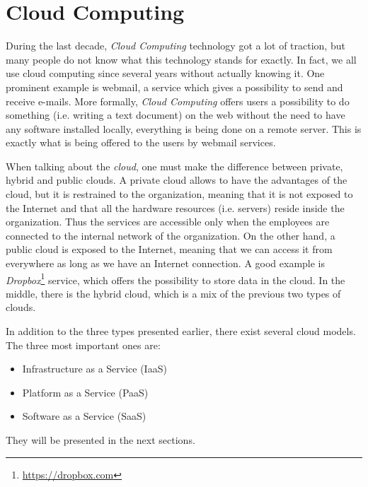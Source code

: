 

\chapter{Cloud Computing}
During the last decade, \textit{Cloud Computing} technology got a lot of traction, but many people do not know what this technology stands for exactly. 
In fact, we all use cloud computing since several years without actually knowing it. One prominent example is webmail, a service which gives a possibility to send and receive e-mails.
More formally, \textit{Cloud Computing} offers users a possibility to do something (i.e. writing a text document) on the web without the need to have any software installed locally, everything is being done on a remote server. 
This is exactly what is being offered to the users by webmail services.

When talking about the \textit{cloud}, one must make the difference between private, hybrid and public clouds. 
A private cloud allows to have the advantages of the cloud, but it is restrained to the organization, meaning that it is not exposed to the Internet and that all the hardware resources (i.e. servers) reside inside the organization. 
Thus the services are accessible only when the employees are connected to the internal network of the organization. 
On the other hand, a public cloud is exposed to the Internet, meaning that we can access it from everywhere as long as we have an Internet connection. 
A good example is \textit{Dropbox}\footnote{\url{https://dropbox.com}} service, which offers the possibility to store data in the cloud. 
In the middle, there is the hybrid cloud, which is a mix of the previous two types of clouds.

In addition to the three types presented earlier, there exist several cloud models.
The three most important ones are: 

{
\singlespacing
\begin{itemize}
	\item Infrastructure as a Service (IaaS)
	\item Platform as a Service (PaaS)
	\item Software as a Service (SaaS)
\end{itemize}
}

They will be presented in the next sections.





